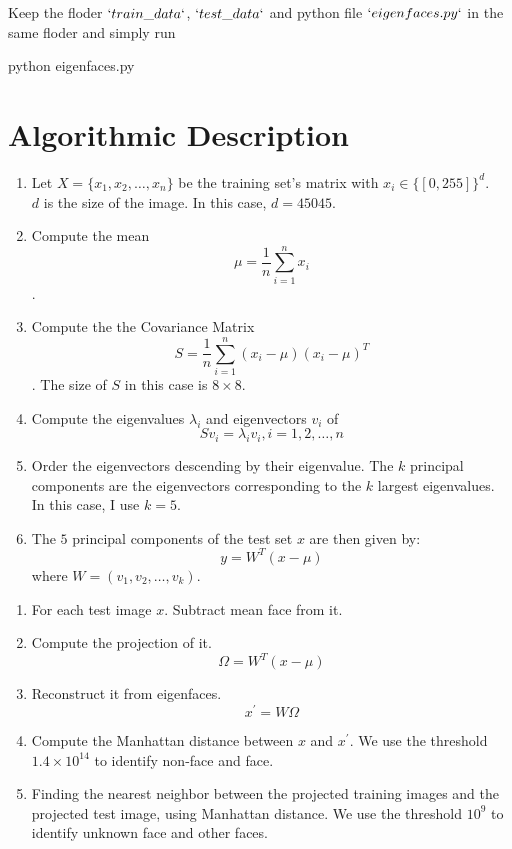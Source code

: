 \documentclass[letterpaper]{polythesis}
\begin{document}
Keep the floder $`train\_data`$, $`test\_data`$ and python file $`eigenfaces.py`$
in the same floder and simply run

\begin{python}
python eigenfaces.py
\end{python}

\chapter{Algorithmic Description}
\label{ch-2}

\begin{enumerate}[step 1]
\item Let $X = \{ x_{1}, x_{2}, \ldots, x_{n} \}$ be the
      training set's matrix with $x_i \in \{[0, 255]\}^{d}$.\\
      $d$ is the size of the image. In this case, $d = 45045$.
\item Compute the mean $$\mu = \frac{1}{n} \sum_{i=1}^{n} x_{i}$$.
\item Compute the the Covariance Matrix
      $$S = \frac{1}{n} \sum_{i=1}^{n} (x_{i} - \mu) (x_{i} - \mu)^T$$.
      The size of $S$ in this case is $8\times 8$.
\item Compute the eigenvalues $\lambda_{i}$ and eigenvectors $v_{i}$ of $$
S v_{i} = \lambda_{i} v_{i}, i=1,2,\ldots,n$$
\item Order the eigenvectors descending by their eigenvalue.
      The $k$ principal components are the eigenvectors corresponding to
      the $k$ largest eigenvalues. \\
      In this case, I use $k=5$.
\item The $5$ principal components of the test set $x$ are then given by:
      $$y = W^{T} (x - \mu)$$
      where $W = (v_{1}, v_{2}, \ldots, v_{k})$.\\
\end{enumerate}

\begin{enumerate}[step 1]
  \item For each test image $x$. Subtract mean face from it.
  \item Compute the projection of it.
        $$\Omega = W^T(x-\mu)$$
  \item Reconstruct it from eigenfaces.
        $$x^\prime = W\Omega$$
  \item Compute the Manhattan distance between $x$ and $x^\prime$.
        We use the threshold $1.4\times 10^{14}$ to identify non-face and face.
  \item Finding the nearest neighbor between the projected training images and
        the projected test image, using Manhattan distance. We use the threshold
        $10^9$ to identify unknown face and other faces.
\end{enumerate}
\end{document}
